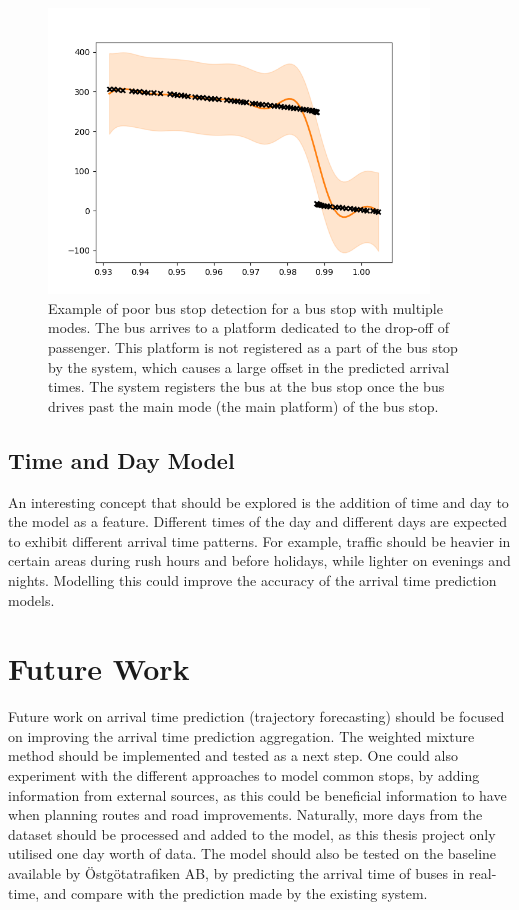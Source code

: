 \begin{figure}[ht!]
    \centering
    \includegraphics[width=0.9\textwidth]{figures/forecasting/bad_gp_rese_centrum}
    \caption[Example of poor bus stop detection for a bus stop with multiple modes]%
    {\small Example of poor bus stop detection for a bus stop with multiple modes.
    The bus arrives to a platform dedicated to the drop-off of passenger.
    This platform is not registered as a part of the bus stop by the system, which causes a large offset in the predicted arrival times.
    The system registers the bus at the bus stop once the bus drives past the main mode (the main platform) of the bus stop.
    }
    \label{fig:bad-gp-rese-c}
\end{figure}

\subsection{Time and Day Model}
An interesting concept that should be explored is the addition of time and day to the model as a feature.
Different times of the day and different days are expected to exhibit different arrival time patterns.
For example, traffic should be heavier in certain areas during rush hours and before holidays, while lighter on evenings and nights. 
Modelling this could improve the accuracy of the arrival time prediction models. 

\section{Future Work}
Future work on arrival time prediction (trajectory forecasting) should be focused on improving the arrival time prediction aggregation.
The weighted mixture method should be implemented and tested as a next step.
One could also experiment with the different approaches to model common stops, by adding information from external sources, as this could be beneficial information to have when planning routes and road improvements.
Naturally, more days from the dataset should be processed and added to the model, as this thesis project only utilised one day worth of data.
The model should also be tested on the baseline available by Östgötatrafiken AB, by predicting the arrival time of buses in real-time, and compare with the prediction made by the existing system.

